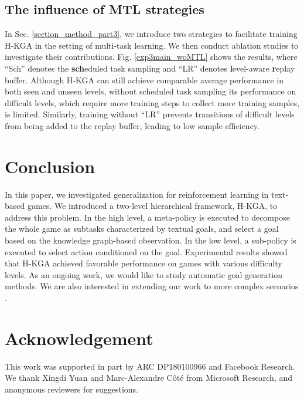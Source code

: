 \documentclass[11pt]{article}
\begin{document}
\subsection{The influence of MTL strategies \label{section_exp_mtl}}

In Sec. \ref{section_method_part3}, we introduce two strategies to facilitate training H-KGA in the setting of multi-task learning.
We then conduct ablation studies to investigate their contributions.
Fig. \ref{exp3main_woMTL} shows the results, where ``Sch'' denotes the \textbf{sch}eduled task sampling and ``LR'' denotes \textbf{l}evel-aware \textbf{r}eplay buffer.
Although H-KGA can still achieve comparable average performance in both seen and unseen levels, without scheduled task sampling its performance on difficult levels, which require more training steps to collect more training samples, is limited.
Similarly, training without ``LR'' prevents transitions of difficult levels from being added to the replay buffer, leading to low sample efficiency. 


\section{Conclusion}

In this paper, we investigated generalization for reinforcement learning in text-based games. 
We introduced a two-level hierarchical framework, H-KGA, to address this problem. 
In the high level, a meta-policy is executed to decompose the whole game as subtasks characterized by textual goals, and select a goal based on the knowledge graph-based observation. In the low level, a sub-policy is executed to select action conditioned on the goal. 
Experimental results showed that H-KGA achieved favorable performance on games with various difficulty levels. 
As an ongoing work, we would like to study automatic goal generation methods. We are also interested in extending our work to more complex scenarios .

\section*{Acknowledgement}
This work was supported in part by ARC DP180100966 and Facebook Research. We thank Xingdi Yuan and Marc-Alexandre C{\^o}t{\'e} from Microsoft Research, and anonymous reviewers for suggestions. 

\end{document}
